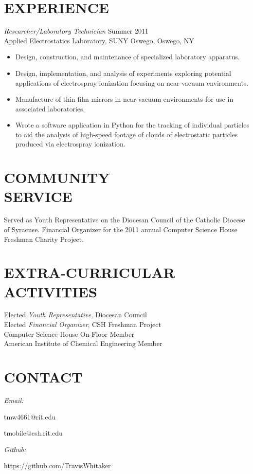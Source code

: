 \documentclass[line,margin]{res}
\begin{document}
\begin{resume}
\section{EXPERIENCE} {\sl Researcher/Laboratory Technician} \hfill Summer 2011 \\
                Applied Electrostatics Laboratory, 
                SUNY Oswego, Oswego, NY
                 \begin{itemize}  \itemsep -2pt %
                \item   Design, construction, and maintenance of 
				        specialized laboratory apparatus.
                \item   Design, implementation, and analysis of
				        experiments exploring potential applications
						of electrospray ionization focusing
						on near-vacuum environments.
				\item   Manufacture of thin-film mirrors in
				        near-vacuum environments for use in
						associated laboratories.
				\item   Wrote a software application in Python
						for the tracking of individual particles
						to aid the analysis of high-speed footage
						of clouds of electrostatic particles
						produced via electrospray ionization.
                \end{itemize}
 
\section{COMMUNITY \\ SERVICE}  Served as Youth Representative on the 
                Diocesan Council of the Catholic Diocese of Syracuse. \newline 
                Financial Organizer for the 2011 annual Computer Science House
                Freshman Charity Project. 

\section{EXTRA-CURRICULAR \\ ACTIVITIES}             
            Elected {\it Youth Representative}, Diocesan Council \\
            Elected {\it Financial Organizer}, CSH Freshman Project \\
            	Computer Science House On-Floor Member \\
                American Institute of Chemical Engineering Member \\

\section{CONTACT}
	{\sl Email:}
	\begin{list}{\quad}{} \itemsep -2pt
	\item	tmw4661@rit.edu
	\item	tmobile@csh.rit.edu
	\end{list}
	{\sl Github:}
	\begin{list}{\quad}{} \itemsep -2pt
	\item https://github.com/TravisWhitaker
	\end{list}
\end{resume}
\end{document}
